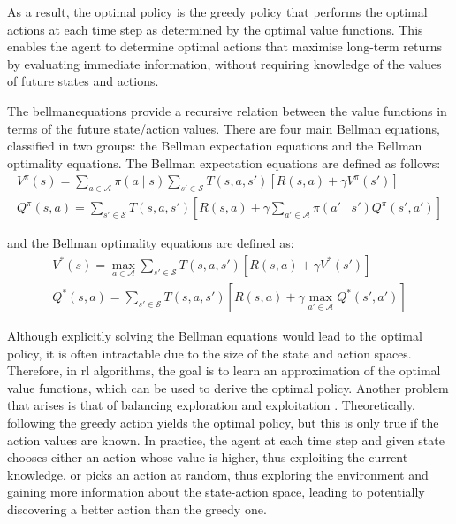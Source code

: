 As a result, the optimal policy is the greedy policy that performs the optimal actions at each time step as determined by the optimal value functions. This enables the agent to determine optimal actions that maximise long-term returns by evaluating immediate information, without requiring knowledge of the values of future states and actions.

The \Gls{bellmanequations} \cite{Bellman1957book} provide a recursive relation between the value functions in terms of the future state/action values. There are four main Bellman equations, classified in two groups: the Bellman expectation equations and the Bellman optimality equations. The Bellman expectation equations are defined as follows:
\begin{eqnarray}
    V^\pi(s) = \sum_{a \in \mathcal{A}} \pi\left(a \mid s\right) \sum_{s'\in \mathcal{S}} T\left(s, a, s'\right) \left[R\left(s,a\right) + \gamma V^\pi(s')\right] \\ 
    Q^\pi(s, a) = \sum_{s'\in \mathcal{S}} T\left(s, a, s'\right) \left[R\left(s,a\right) + \gamma \sum_{a' \in \mathcal{A}} \pi\left(a' \mid s'\right) Q^\pi(s', a')\right]
\end{eqnarray}

and the Bellman optimality equations are defined as:
\begin{eqnarray}
    V^*(s) = \max_{a \in \mathcal{A}} \sum_{s'\in \mathcal{S}} T\left(s, a, s'\right) \left[R\left(s,a\right) + \gamma V^*(s')\right] \\
    Q^*(s, a) = \sum_{s'\in \mathcal{S}} T\left(s, a, s'\right) \left[R\left(s,a\right) + \gamma \max_{a' \in \mathcal{A}} Q^*(s', a')\right]
\end{eqnarray}

Although explicitly solving the Bellman equations would lead to the optimal policy, it is often intractable due to the size of the state and action spaces. Therefore, in \acrshort{rl} algorithms, the goal is to learn an approximation of the optimal value functions, which can be used to derive the optimal policy. Another problem that arises is that of balancing exploration and exploitation \cite{Thrun1992}. Theoretically, following the greedy action yields the optimal policy, but this is only true if the action values are known. In practice, the agent at each time step and given state chooses either an action whose value is higher, thus exploiting the current knowledge, or picks an action at random, thus exploring the environment and gaining more information about the state-action space, leading to potentially discovering a better action than the greedy one.


